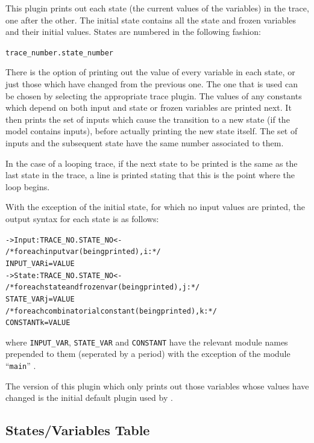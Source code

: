 This plugin prints out each state (the current values of the
variables) in the trace, one after the other. The initial state
contains all the state and frozen variables and their initial
values. States are numbered in the following fashion:

\begin{center}
\texttt{trace\_number.state\_number}
\end{center}

There is the option of printing out the value of every variable in
each state, or just those which have changed from the previous
one. The one that is used can be chosen by selecting the appropriate
trace plugin. The values of any constants which depend on both input
and state or frozen variables are printed next. It then prints the set of inputs
which cause the transition to a new state (if the model contains
inputs), before actually printing the new state itself. The set of
inputs and the subsequent state have the same number associated to
them.

In the case of a looping trace, if the next state to be printed is the
same as the last state in the trace, a line is printed stating that
this is the point where the loop begins.

With the exception of the initial state, for which no input values are
printed, the output syntax for each state is as follows:

\begin{alltt}
-> Input: TRACE_NO.STATE_NO <-
    /* for each input var (being printed), i: */
    INPUT_VARi = VALUE
-> State: TRACE_NO.STATE_NO <-
    /* for each state and frozen var (being printed), j: */
    STATE_VARj = VALUE
    /* for each combinatorial constant (being printed), k: */
    CONSTANTk = VALUE
\end{alltt}

where \texttt{INPUT\_VAR}, \texttt{STATE\_VAR} and \texttt{CONSTANT}
have the relevant module names prepended to them (seperated by a
period) with the exception of the module ``\texttt{main}'' .

The version of this plugin which only prints out those variables whose
values have changed is the initial default plugin used by \nusmv.


\subsection{States/Variables Table}
\label{States/Variables Table}

